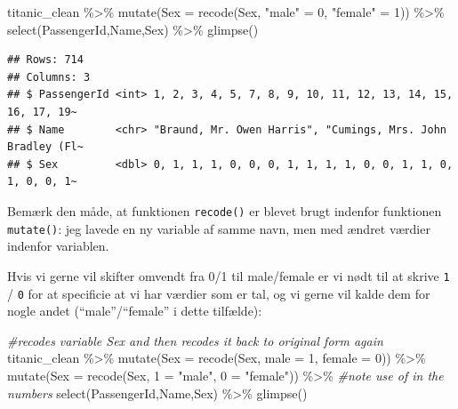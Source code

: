 \documentclass[
]{book}
\newenvironment{Shaded}{\begin{snugshade}}{\end{snugshade}}
\newcommand{\AttributeTok}[1]{\textcolor[rgb]{0.77,0.63,0.00}{#1}}
\newcommand{\CommentTok}[1]{\textcolor[rgb]{0.56,0.35,0.01}{\textit{#1}}}
\newcommand{\DecValTok}[1]{\textcolor[rgb]{0.00,0.00,0.81}{#1}}
\newcommand{\FunctionTok}[1]{\textcolor[rgb]{0.00,0.00,0.00}{#1}}
\newcommand{\NormalTok}[1]{#1}
\newcommand{\OtherTok}[1]{\textcolor[rgb]{0.56,0.35,0.01}{#1}}
\newcommand{\SpecialCharTok}[1]{\textcolor[rgb]{0.00,0.00,0.00}{#1}}
\newcommand{\StringTok}[1]{\textcolor[rgb]{0.31,0.60,0.02}{#1}}
\begin{document}
\begin{Shaded}
\begin{Highlighting}[]
\NormalTok{ titanic\_clean }\SpecialCharTok{\%\textgreater{}\%}
   \FunctionTok{mutate}\NormalTok{(}\AttributeTok{Sex =} \FunctionTok{recode}\NormalTok{(Sex,  }\StringTok{"male"} \OtherTok{=} \DecValTok{0}\NormalTok{, }\StringTok{"female"} \OtherTok{=} \DecValTok{1}\NormalTok{)) }\SpecialCharTok{\%\textgreater{}\%}
   \FunctionTok{select}\NormalTok{(PassengerId,Name,Sex) }\SpecialCharTok{\%\textgreater{}\%} \FunctionTok{glimpse}\NormalTok{()}
\end{Highlighting}
\end{Shaded}

\begin{verbatim}
## Rows: 714
## Columns: 3
## $ PassengerId <int> 1, 2, 3, 4, 5, 7, 8, 9, 10, 11, 12, 13, 14, 15, 16, 17, 19~
## $ Name        <chr> "Braund, Mr. Owen Harris", "Cumings, Mrs. John Bradley (Fl~
## $ Sex         <dbl> 0, 1, 1, 1, 0, 0, 0, 1, 1, 1, 1, 0, 0, 1, 1, 0, 1, 0, 0, 1~
\end{verbatim}

Bemærk den måde, at funktionen \texttt{recode()} er blevet brugt indenfor funktionen \texttt{mutate()}: jeg lavede en ny variable af samme navn, men med ændret værdier indenfor variablen.

Hvis vi gerne vil skifter omvendt fra 0/1 til male/female er vi nødt til at skrive \texttt{1} / \texttt{0} for at specificie at vi har værdier som er tal, og vi gerne vil kalde dem for nogle andet (``male''/``female'' i dette tilfælde):

\begin{Shaded}
\begin{Highlighting}[]
\CommentTok{\#recodes variable Sex and then recodes it back to original form again}
\NormalTok{ titanic\_clean }\SpecialCharTok{\%\textgreater{}\%}
   \FunctionTok{mutate}\NormalTok{(}\AttributeTok{Sex =} \FunctionTok{recode}\NormalTok{(Sex,  }\AttributeTok{male =} \DecValTok{1}\NormalTok{, }\AttributeTok{female =} \DecValTok{0}\NormalTok{)) }\SpecialCharTok{\%\textgreater{}\%}
   \FunctionTok{mutate}\NormalTok{(}\AttributeTok{Sex =} \FunctionTok{recode}\NormalTok{(Sex,  }\StringTok{\textasciigrave{}}\AttributeTok{1}\StringTok{\textasciigrave{}} \OtherTok{=} \StringTok{"male"}\NormalTok{, }\StringTok{\textasciigrave{}}\AttributeTok{0}\StringTok{\textasciigrave{}} \OtherTok{=} \StringTok{"female"}\NormalTok{)) }\SpecialCharTok{\%\textgreater{}\%} \CommentTok{\#note use of \textasciigrave{}\textasciigrave{} in the numbers }
   \FunctionTok{select}\NormalTok{(PassengerId,Name,Sex) }\SpecialCharTok{\%\textgreater{}\%} \FunctionTok{glimpse}\NormalTok{()}
\end{Highlighting}
\end{Shaded}
\end{document}
